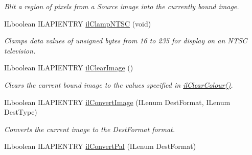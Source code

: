 \begin{DoxyCompactItemize}
\begin{DoxyCompactList}\small\item\em Blit a region of pixels from a {\itshape Source} image into the currently bound image. \end{DoxyCompactList}\item 
I\-Lboolean I\-L\-A\-P\-I\-E\-N\-T\-R\-Y \hyperlink{group__image__manip_gab2c623d693bf0f5c2f046a64af7b22ba}{il\-Clamp\-N\-T\-S\-C} (void)
\begin{DoxyCompactList}\small\item\em Clamps data values of unsigned bytes from 16 to 235 for display on an N\-T\-S\-C television. \end{DoxyCompactList}\item 
\hypertarget{group__image__manip_gae48d76d54f6f00fe54b304c29224653f}{I\-Lboolean I\-L\-A\-P\-I\-E\-N\-T\-R\-Y \hyperlink{group__image__manip_gae48d76d54f6f00fe54b304c29224653f}{il\-Clear\-Image} ()}\label{group__image__manip_gae48d76d54f6f00fe54b304c29224653f}

\begin{DoxyCompactList}\small\item\em Clears the current bound image to the values specified in \hyperlink{group__state_gaca1dc7f7b8e61eb134060c9c8a8b72f2}{il\-Clear\-Colour()}. \end{DoxyCompactList}\item 
I\-Lboolean I\-L\-A\-P\-I\-E\-N\-T\-R\-Y \hyperlink{group__image__manip_ga82b125402ed12ed399f181165374a7c1}{il\-Convert\-Image} (I\-Lenum Dest\-Format, I\-Lenum Dest\-Type)
\begin{DoxyCompactList}\small\item\em Converts the current image to the Dest\-Format format. \end{DoxyCompactList}\item 
\hypertarget{group__image__manip_gaf3e055a50d9dcc791b249bfd6152ba58}{I\-Lboolean I\-L\-A\-P\-I\-E\-N\-T\-R\-Y \hyperlink{group__image__manip_gaf3e055a50d9dcc791b249bfd6152ba58}{il\-Convert\-Pal} (I\-Lenum Dest\-Format)}\label{group__image__manip_gaf3e055a50d9dcc791b249bfd6152ba58}


\end{DoxyCompactItemize}
